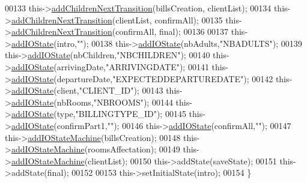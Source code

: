 \begin{DoxyCode}
00133     this->\hyperlink{classSH__InOutStateMachine_aa78420f8778d7777809aad77eb8473b4}{addChildrenNextTransition}(billsCreation, clientList);
00134     this->\hyperlink{classSH__InOutStateMachine_aa78420f8778d7777809aad77eb8473b4}{addChildrenNextTransition}(clientList, confirmAll);
00135     this->\hyperlink{classSH__InOutStateMachine_aa78420f8778d7777809aad77eb8473b4}{addChildrenNextTransition}(confirmAll, \textcolor{keyword}{final});
00136 
00137     this->\hyperlink{classSH__InOutStateMachine_a2528cffddbe6f98c32ebef41423c0118}{addIOState}(intro,\textcolor{stringliteral}{""});
00138     this->\hyperlink{classSH__InOutStateMachine_a2528cffddbe6f98c32ebef41423c0118}{addIOState}(nbAdults,\textcolor{stringliteral}{"NBADULTS"});
00139     this->\hyperlink{classSH__InOutStateMachine_a2528cffddbe6f98c32ebef41423c0118}{addIOState}(nbChildren,\textcolor{stringliteral}{"NBCHILDREN"});
00140     this->\hyperlink{classSH__InOutStateMachine_a2528cffddbe6f98c32ebef41423c0118}{addIOState}(arrivingDate,\textcolor{stringliteral}{"ARRIVINGDATE"});
00141     this->\hyperlink{classSH__InOutStateMachine_a2528cffddbe6f98c32ebef41423c0118}{addIOState}(departureDate,\textcolor{stringliteral}{"EXPECTEDDEPARTUREDATE"});
00142     this->\hyperlink{classSH__InOutStateMachine_a2528cffddbe6f98c32ebef41423c0118}{addIOState}(client,\textcolor{stringliteral}{"CLIENT\_ID"});
00143     this->\hyperlink{classSH__InOutStateMachine_a2528cffddbe6f98c32ebef41423c0118}{addIOState}(nbRooms,\textcolor{stringliteral}{"NBROOMS"});
00144     this->\hyperlink{classSH__InOutStateMachine_a2528cffddbe6f98c32ebef41423c0118}{addIOState}(type,\textcolor{stringliteral}{"BILLINGTYPE\_ID"});
00145     this->\hyperlink{classSH__InOutStateMachine_a2528cffddbe6f98c32ebef41423c0118}{addIOState}(confirmPart1,\textcolor{stringliteral}{""});
00146     this->\hyperlink{classSH__InOutStateMachine_a2528cffddbe6f98c32ebef41423c0118}{addIOState}(confirmAll,\textcolor{stringliteral}{""});
00147     this->\hyperlink{classSH__InOutStateMachine_a6f65dff277508e650eb697628c857b19}{addIOStateMachine}(billsCreation);
00148     this->\hyperlink{classSH__InOutStateMachine_a6f65dff277508e650eb697628c857b19}{addIOStateMachine}(roomsAffectation);
00149     this->\hyperlink{classSH__InOutStateMachine_a6f65dff277508e650eb697628c857b19}{addIOStateMachine}(clientList);
00150     this->addState(saveState);
00151     this->addState(\textcolor{keyword}{final});
00152 
00153     this->setInitialState(intro);
00154 \}
\end{DoxyCode}


